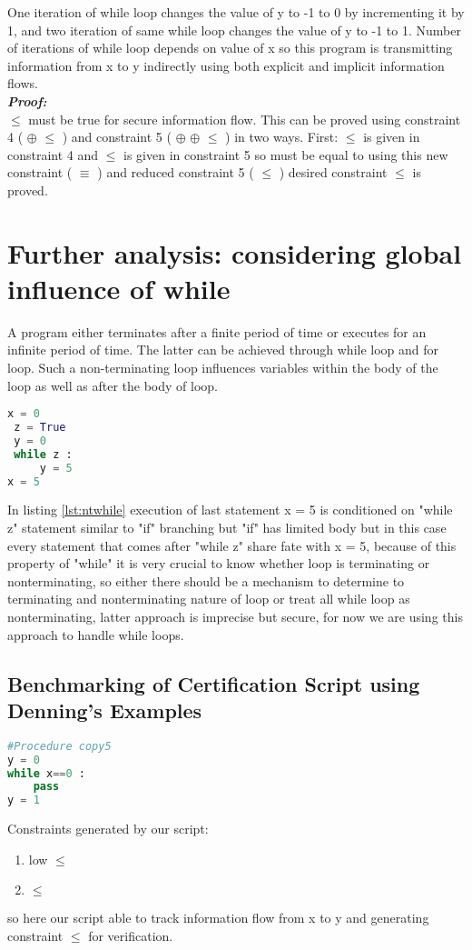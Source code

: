 One iteration of while loop changes the value of y to -1 to 0 by incrementing it by 1, and two iteration of same while loop changes the value of y to -1 to 1. Number of iterations of while loop depends on value of x so this program is transmitting information from x to y indirectly using both explicit and implicit information flows.\\  
\textbf{\textit{Proof:}}\\
 $\leqslant$  must be true for secure information flow. This can be proved using constraint 4 (  $\oplus$  $\leqslant$ )
and constraint 5 ( $\oplus$  $\oplus$  $\leqslant$ ) in two ways. First:  $\leqslant$  is given in constraint 4 and  $\leqslant$  is given in constraint 5 so  must be equal to  using this new constraint (  $\equiv$  ) and reduced constraint 5 ( $\leqslant$ ) desired constraint  $\leqslant$  is proved.  
\section{Further analysis: considering global influence of while}
A program either terminates after a finite period of time or executes for an infinite period of time. The latter can be achieved through while loop and for loop. Such a non-terminating loop influences variables within the body of the loop as well as after the body of loop.
 \begin{lstlisting}[language=Python, caption=Non terminating while., label={lst:ntwhile} ]
 x = 0
 z = True
 y = 0
 while z :
	 y = 5
x = 5	
 \end{lstlisting}
In listing \ref{lst:ntwhile} execution of last statement x = 5 is conditioned on "while z" statement similar to "if" branching but "if" has limited body but in this case every statement that comes after "while z" share fate with x = 5, because of this property of "while" it is very crucial to know whether loop is terminating or nonterminating, so either there should be a mechanism to determine to terminating and nonterminating nature of loop or treat all while loop as nonterminating, latter approach is imprecise but secure, for now we are using this approach to handle while loops.
\subsection{Benchmarking of Certification Script using Denning's Examples \cite{denning}}
\begin{lstlisting}[language=Python, caption=Python version of copy5 example in \cite{denning}. goal: information flow from x to y, label={lst:copy5} ]
#Procedure copy5
y = 0
while x==0 :
	pass
y = 1
\end{lstlisting}  
Constraints generated by our script:
\begin{enumerate}
	\item low $\leqslant$ 
	\item {} $\leqslant$ 
\end{enumerate}
so here our script able to track information flow from x to y and generating constraint  $\leqslant$  for verification.

